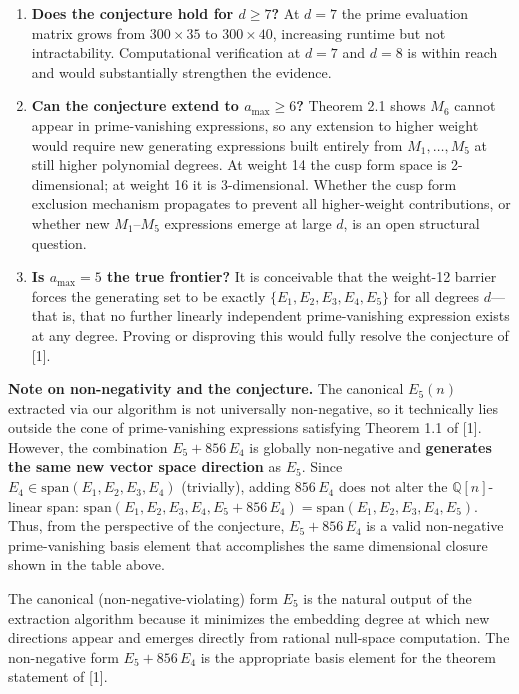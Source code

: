 \documentclass[
  11pt,
]{article}
\begin{document}
\begin{enumerate}
\def\labelenumi{\arabic{enumi}.}
\item
  \textbf{Does the conjecture hold for \(d \geq 7\)?} At \(d=7\) the
  prime evaluation matrix grows from \(300 \times 35\) to
  \(300 \times 40\), increasing runtime but not intractability.
  Computational verification at \(d=7\) and \(d=8\) is within reach and
  would substantially strengthen the evidence.
\item
  \textbf{Can the conjecture extend to \(a_{\max} \geq 6\)?} Theorem 2.1
  shows \(M_6\) cannot appear in prime-vanishing expressions, so any
  extension to higher weight would require new generating expressions
  built entirely from \(M_1,\ldots,M_5\) at still higher polynomial
  degrees. At weight 14 the cusp form space is 2-dimensional; at weight
  16 it is 3-dimensional. Whether the cusp form exclusion mechanism
  propagates to prevent all higher-weight contributions, or whether new
  \(M_1\)--\(M_5\) expressions emerge at large \(d\), is an open
  structural question.
\item
  \textbf{Is \(a_{\max} = 5\) the true frontier?} It is conceivable that
  the weight-12 barrier forces the generating set to be exactly
  \(\{E_1, E_2, E_3, E_4, E_5\}\) for all degrees \(d\)---that is, that
  no further linearly independent prime-vanishing expression exists at
  any degree. Proving or disproving this would fully resolve the
  conjecture of {[}1{]}.
\end{enumerate}

\textbf{Note on non-negativity and the conjecture.} The canonical
\(E_5(n)\) extracted via our algorithm is not universally non-negative,
so it technically lies outside the cone of prime-vanishing expressions
satisfying Theorem 1.1 of {[}1{]}. However, the combination
\(E_5 + 856\,E_4\) is globally non-negative and \textbf{generates the
same new vector space direction} as \(E_5\). Since
\(E_4 \in \mathrm{span}(E_1, E_2, E_3, E_4)\) (trivially), adding
\(856\,E_4\) does not alter the \(\mathbb{Q}[n]\)-linear span:
\(\mathrm{span}(E_1, E_2, E_3, E_4, E_5 + 856\,E_4) = \mathrm{span}(E_1, E_2, E_3, E_4, E_5)\).
Thus, from the perspective of the conjecture, \(E_5 + 856\,E_4\) is a
valid non-negative prime-vanishing basis element that accomplishes the
same dimensional closure shown in the table above.

The canonical (non-negative-violating) form \(E_5\) is the natural
output of the extraction algorithm because it minimizes the embedding
degree at which new directions appear and emerges directly from rational
null-space computation. The non-negative form \(E_5 + 856\,E_4\) is the
appropriate basis element for the theorem statement of {[}1{]}.
\end{document}
